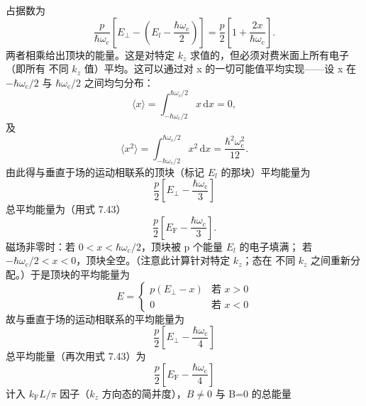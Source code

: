 占据数为
\begin{equation*}
\frac{p}{\hbar\omega_{\mathrm{c}}}\left[E_{\perp}-\left(E_l-\frac{\hbar\omega_{\mathrm{c}}}{2}\right)\right] = \frac{p}{2}\left[1+\frac{2x}{\hbar\omega_{\mathrm{c}}}\right].\tag{7.46}
\end{equation*}
两者相乘给出顶块的能量。这是对特定 $k_z$ 求值的，但必须对费米面上所有电子（即所有
不同 $k_z$ 值）平均。这可以通过对 x 的一切可能值平均实现——设 x 在
$-\hbar\omega_{\mathrm{c}}/2$ 与 $\hbar\omega_{\mathrm{c}}/2$ 之间均匀分布：
\begin{equation*}
\langle x\rangle = \int_{-\hbar\omega_{\mathrm{c}}/2}^{\hbar\omega_{\mathrm{c}}/2}x\,\mathrm{d}x = 0,\tag{7.47}
\end{equation*}
及
\begin{equation*}
\langle x^{2}\rangle = \int_{-\hbar\omega_{\mathrm{c}}/2}^{\hbar\omega_{\mathrm{c}}/2}x^{2}\,\mathrm{d}x = \frac{\hbar^{2}\omega_{\mathrm{c}}^{2}}{12}.\tag{7.48}
\end{equation*}
由此得与垂直于场的运动相联系的顶块（标记 $E_l$ 的那块）平均能量为
\begin{equation*}
\frac{p}{2}\left[E_{\perp}-\frac{\hbar\omega_{\mathrm{c}}}{3}\right]\tag{7.49}
\end{equation*}
总平均能量为（用式 7.43）
\begin{equation*}
\frac{p}{2}\left[E_{\mathrm{F}}-\frac{\hbar\omega_{\mathrm{c}}}{3}\right].\tag{7.50}
\end{equation*}
磁场非零时：若 $0<x<\hbar\omega_{\mathrm{c}}/2$，顶块被 p 个能量 $E_l$ 的电子填满；
若 $-\hbar\omega_{\mathrm{c}}/2<x<0$，顶块全空。（注意此计算针对特定 $k_z$；态在
不同 $k_z$ 之间重新分配。）于是顶块的平均能量为
\begin{equation*}
E = \begin{cases} p(E_{\perp}-x) & \text{若 } x>0\\ 0 & \text{若 } x<0 \end{cases}\tag{7.51}
\end{equation*}
故与垂直于场的运动相联系的平均能量为
\begin{equation*}
\frac{p}{2}\left[E_{\perp}-\frac{\hbar\omega_{\mathrm{c}}}{4}\right]\tag{7.52}
\end{equation*}
总平均能量（再次用式 7.43）为
\begin{equation*}
\frac{p}{2}\left[E_{\mathrm{F}}-\frac{\hbar\omega_{\mathrm{c}}}{4}\right]\tag{7.53}
\end{equation*}
计入 $k_{\mathrm{F}}L/\pi$ 因子（$k_z$ 方向态的简并度），$B\neq0$ 与 B=0 的总能量

